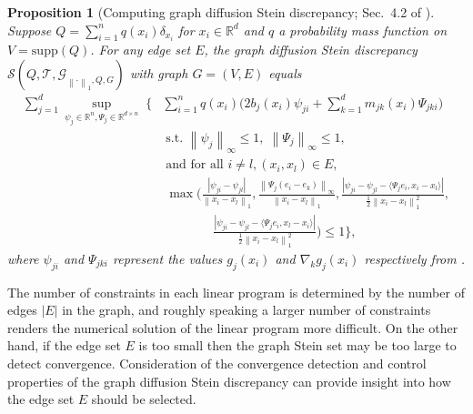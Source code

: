 \documentclass[12pt,paper=letter]{scrreprt}
\newtheorem{proposition}{Proposition}[chapter]
\def\reals{\mathbb{R}} %
\def\R{\mathbb{R}}
\newcommand{\Rd}{{\R}^d}
\def\norm#1{\left\|{#1}\right\|} %
\newcommand{\onenorm}[1]{\norm{#1}_1} %
\newcommand{\infnorm}[1]{\norm{#1}_{\infty}} %
\newcommand{\inner}[2]{\langle{#1},{#2}\rangle} %
\newcommand{\grad}{\nabla} %
\def\supp#1{\mathrm{supp}({#1})}
\newcommand{\gset}[0]{\mathcal{G}} %
\newcommand{\gsteinset}[2]{\gset_{\norm{\cdot}_{#1},Q,{#2}}} %
\newcommand{\diffusion}[1]{\mathcal{T}{#1}} %
\newcommand{\stein}[3]{\mathcal{S}({#1},{#2},{#3})} %
\newcommand{\diffstein}[2]{\stein{#1}{\diffusion{}}{#2}} %
\begin{document}
\begin{proposition}[Computing graph diffusion Stein discrepancy; Sec.~4.2 of \citealp{Gorham2019}]
\label{prop: compute graph stein}
Suppose $Q = \sum_{i=1}^n q(x_i) \delta_{x_i}$ for $x_i\in\Rd$ and $q$ a probability mass function on $V = \supp{Q}$. 
For any edge set $E$, the graph diffusion Stein discrepancy $\diffstein{Q}{\gsteinset{1}{G}}$ with graph $G=(V,E)$ equals
\begin{align}
\sum_{j=1}^d 
\sup_{\psi_j\in \reals^{n}, \Psi_j\in\reals^{d\times n}}\; 
\bigg\{ &
\sum_{i=1}^{n} q(x_i) \bigg( 2b_j(x_i) \psi_{ji} + \sum_{k=1}^d m_{jk}(x_i)\Psi_{jki} \bigg) \label{eqn:l1-program} \\ 
& \; \text{s.t. }
\infnorm{\psi_j} \leq 1, \;
\infnorm{\Psi_j} \leq 1, \nonumber \\
& \; \text{and for all } i\neq l, (x_i,x_l) \in E, \nonumber \\
& \; \max \bigg(
  \textstyle\frac{|\psi_{ji} - \psi_{jl}|}{\onenorm{x_i - x_l}},
  \textstyle\frac{\infnorm{\Psi_j(e_i - e_k)}}{\onenorm{x_i - x_l}},
  \textstyle\frac{|\psi_{ji} - \psi_{jl} - \inner{\Psi_j e_i}{x_i - x_l}|}{\frac{1}{2}\onenorm{x_i - x_l}^2}, \nonumber \\
  & \qquad \qquad 
  \textstyle\frac{|\psi_{ji} - \psi_{jl} - \inner{\Psi_j e_i}{x_l - x_i}|}{\frac{1}{2}\onenorm{x_i - x_l}^2}
\bigg) \le 1 \bigg\} , \nonumber
\end{align}
where $\psi_{ji}$ and $\Psi_{jki}$ represent the values $g_j(x_i)$ and $\grad_k g_j(x_i)$ respectively from .
\end{proposition}

\noindent The number of constraints in each linear program is determined by the number of edges $|E|$ in the graph, and roughly speaking a larger number of constraints renders the numerical solution of the linear program more difficult.
On the other hand, if the edge set $E$ is too small then the graph Stein set may be too large to detect convergence. 
Consideration of the convergence detection and control properties of the graph diffusion Stein discrepancy can provide insight into how the edge set $E$ should be selected.
\end{document}
